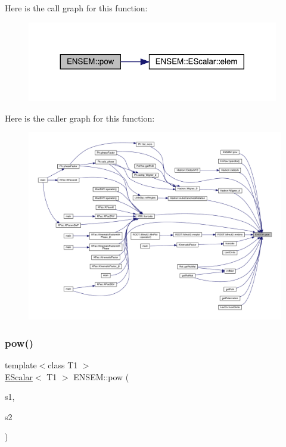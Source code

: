 Here is the call graph for this function\+:
\nopagebreak
\begin{figure}[H]
\begin{center}
\leavevmode
\includegraphics[width=311pt]{d4/dca/group__escalar_gaa3f8d5129f1ded089d42af89bd94827d_cgraph}
\end{center}
\end{figure}
Here is the caller graph for this function\+:
\nopagebreak
\begin{figure}[H]
\begin{center}
\leavevmode
\includegraphics[width=350pt]{d4/dca/group__escalar_gaa3f8d5129f1ded089d42af89bd94827d_icgraph}
\end{center}
\end{figure}
\mbox{\label{group__escalar_gaba7571beee718548316367ab8d623e70}} 
\subsubsection{\texorpdfstring{pow()}{pow()}\hspace{0.1cm}{\footnotesize\ttfamily [2/2]}}
{\footnotesize\ttfamily template$<$class T1 $>$ \\
\mbox{\hyperlink{classENSEM_1_1EScalar}{E\+Scalar}}$<$ T1 $>$ E\+N\+S\+E\+M\+::pow (\begin{DoxyParamCaption}\item[{const \mbox{\hyperlink{classENSEM_1_1EScalar}{E\+Scalar}}$<$ T1 $>$ \&}]{s1,  }\item[{int}]{s2 }\end{DoxyParamCaption})\hspace{0.3cm}{\ttfamily [inline]}}



